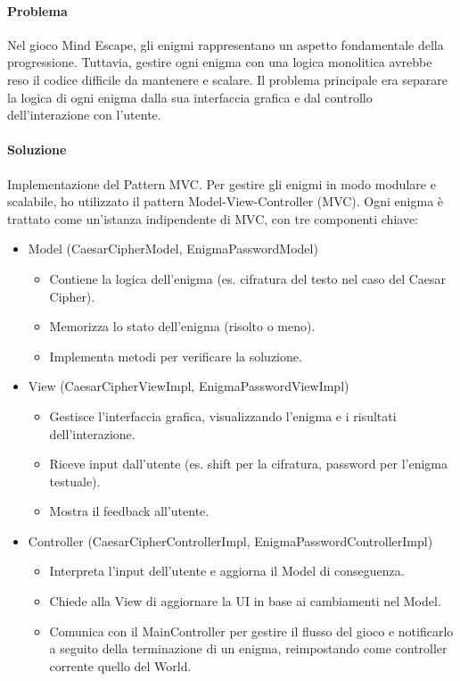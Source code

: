\documentclass[a4paper,12pt]{report}
\begin{document}
\paragraph{Problema} %
Nel gioco Mind Escape, gli enigmi rappresentano un aspetto fondamentale della progressione. Tuttavia, gestire ogni enigma con una logica monolitica avrebbe reso il codice difficile da mantenere e scalare. Il problema principale era separare la logica di ogni enigma dalla sua interfaccia grafica e dal controllo dell’interazione con l’utente.
\paragraph{Soluzione} %
Implementazione del Pattern MVC.
Per gestire gli enigmi in modo modulare e scalabile, ho utilizzato il pattern Model-View-Controller (MVC). Ogni enigma è trattato come un'istanza indipendente di MVC, con tre componenti chiave:
\begin{itemize}
	\item Model (CaesarCipherModel, EnigmaPasswordModel)
		\begin{itemize}
			\item Contiene la logica dell’enigma (es. cifratura del testo nel caso del Caesar Cipher).
			\item Memorizza lo stato dell’enigma (risolto o meno).
			\item Implementa metodi per verificare la soluzione.
		\end{itemize}
	\item View (CaesarCipherViewImpl, EnigmaPasswordViewImpl)
		\begin{itemize}
			\item Gestisce l’interfaccia grafica, visualizzando l’enigma e i risultati dell’interazione.
			\item Riceve input dall’utente (es. shift per la cifratura, password per l’enigma testuale).
			\item Mostra il feedback all’utente.
		\end{itemize}
	\item Controller (CaesarCipherControllerImpl, EnigmaPasswordControllerImpl)
		\begin{itemize}
			\item Interpreta l’input dell’utente e aggiorna il Model di conseguenza.
			\item Chiede alla View di aggiornare la UI in base ai cambiamenti nel Model.
			\item Comunica con il MainController per gestire il flusso del gioco e notificarlo a seguito della terminazione di un enigma, reimpostando come controller corrente quello del World.
		\end{itemize}
\end{itemize}
\end{document}
